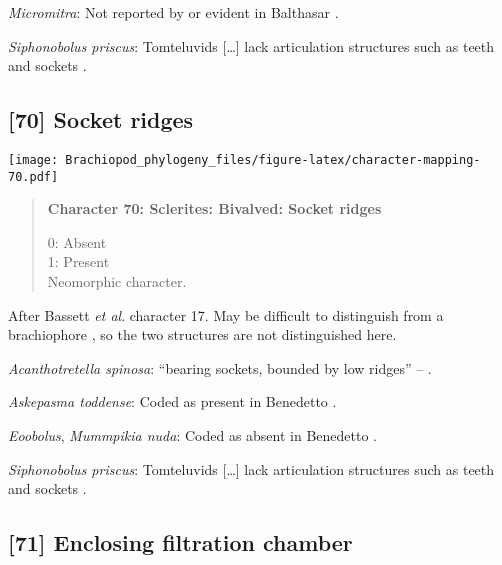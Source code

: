 \documentclass[openany]{book}
\theoremstyle{definition}
\theoremstyle{definition}
\theoremstyle{definition}
\theoremstyle{remark}
\begin{document}
\hypertarget{Micromitra-coding-69}{}
\emph{Micromitra}: Not reported by or evident in Balthasar
\citeyearpar{Balthasar2004Shellstructure}.

\hypertarget{Siphonobolus_priscus-coding-69}{}
\emph{Siphonobolus priscus}: Tomteluvids {[}\ldots{}{]} lack
articulation structures such as teeth and sockets
\citep{Streng2016Anew}.

\subsection*{{[}70{]} Socket ridges}\label{socket-ridges}

\texttt{[image: Brachiopod\_phylogeny\_files/figure-latex/character-mapping-70.pdf]}

\begin{quote}
\textbf{Character 70: Sclerites: Bivalved: Socket ridges}

0: Absent\\
1: Present\\
Neomorphic character.
\end{quote}

After Bassett \emph{et al}.
\citeyearpar{Bassett2001Functionalmorphology} character 17. May be
difficult to distinguish from a brachiophore \citep[see Fig 323
in][]{Williams1997Introduction}, so the two structures are not
distinguished here.

\hypertarget{Acanthotretella_spinosa-coding-70}{}
\emph{Acanthotretella spinosa}: ``bearing sockets, bounded by low
ridges'' -- \citet{Williams2000LinguliformeaCraniiformea}.

\hypertarget{Askepasma_toddense-coding-70}{}
\emph{Askepasma toddense}: Coded as present in Benedetto
\citeyearpar{Benedetto2009iChaniella}.

\hypertarget{Eoobolus-coding-70}{}
\emph{Eoobolus}, \emph{Mummpikia nuda}: Coded as absent in Benedetto
\citeyearpar{Benedetto2009iChaniella}.

\hypertarget{Siphonobolus_priscus-coding-70}{}
\emph{Siphonobolus priscus}: Tomteluvids {[}\ldots{}{]} lack
articulation structures such as teeth and sockets
\citep{Streng2016Anew}.

\subsection*{{[}71{]} Enclosing filtration
chamber}\label{enclosing-filtration-chamber}
\end{document}
